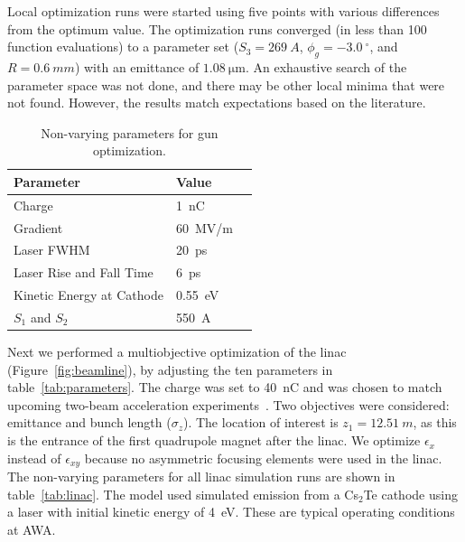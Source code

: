 Local optimization runs were started using five points 
with various 
differences from the optimum value. The optimization runs converged 
(in less than 100 function evaluations) to a parameter set ($S_3=\SI{269}{A}$,
$\phi_g=\SI{-3.0}{^{\circ}}$, and $R=\SI{0.6}{mm}$) with an emittance of $\SI{1.08}{\um}$.
An exhaustive search of the parameter space was not done, and there may be other local minima that were not found.
However, the results match expectations based on the literature. 
\begin{table}%
	\caption{\label{tab:gun} Non-varying parameters for gun optimization.}
	\begin{center}
		\begin{tabular}{lll}
			\toprule
			\textbf{Parameter} & \textbf{Value} \\
			\midrule
			Charge  & \SI{1}{nC} \\
			Gradient & \SI{60}{MV/m} \\
			Laser FWHM & \SI{20}{ps} \\
			Laser Rise and Fall Time & \SI{6}{ps} \\
			Kinetic Energy at Cathode  & \SI{0.55}{eV} \\
			$S_1$ and $S_2$ & \SI{550}{A} \\
			\bottomrule
		\end{tabular}
	\end{center}
\end{table}

\label{sec:linacopt}
Next we performed a multiobjective optimization of the linac (Figure~\ref{fig:beamline}), 
by adjusting the ten parameters in table~\ref{tab:parameters}. The charge was set to \SI{40}{nC}
and was chosen to match upcoming two-beam acceleration experiments~\cite{tba2017}. 
Two objectives were considered: emittance and bunch length ($\sigma_z$). 
The location of interest is $z_1=\SI{12.51}{m}$, as this is the entrance of the first 
quadrupole magnet after the linac. We optimize $\epsilon_x$ instead of $\epsilon_{xy}$ because 
no asymmetric focusing elements were used in the linac. 
The non-varying parameters for all linac simulation runs are shown in table~\ref{tab:linac}.
The model used simulated emission
from a Cs$_2$Te cathode using a laser with initial kinetic energy of \SI{4}{eV}. 
These are typical operating conditions at AWA. 

